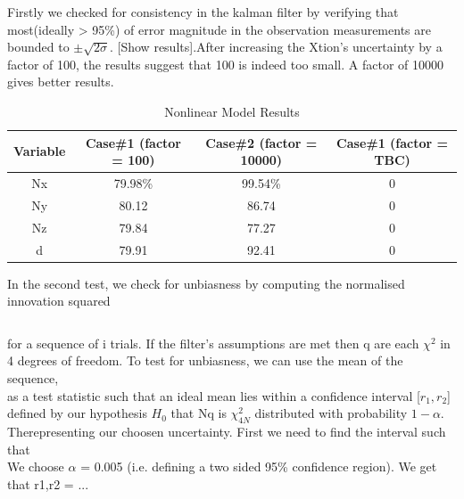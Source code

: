 \documentclass[]{article}
\begin{document}
{Firstly we checked for consistency in the kalman filter by verifying that most(ideally > 95\%) of error magnitude in the observation measurements are bounded to $\pm\sqrt{2\sigma}$. [Show results].After increasing the Xtion's uncertainty by a factor of 100, the results suggest that 100 is indeed too small. A factor of 10000 gives better results.

\begin{table}[ht]
\caption{Nonlinear Model Results} %
\centering %
\begin{tabular}{c c c c} %
\hline\hline %
Variable & Case\#1 (factor = 100) & Case\#2 (factor = 10000) & Case\#1 (factor = TBC) \\ [0.5ex] %
\hline %
    Nx 	& 79.98\% 	& 99.54\%	& 0\\
    Ny 	& 80.12 	& 86.74 	&0\\
    Nz 	& 79.84 	& 77.27 	&0\\
    d 	& 79.91 	&	92.41 	&0\\ [1ex] %
\hline %
\end{tabular}
\label{table:firstTest} %
\end{table}

 In the second test, we check for unbiasness by computing the normalised innovation squared

\begin{equation}\label{first}
\end{equation}

for a sequence of i trials. If the filter's assumptions are met then q are each $\chi^{2}$ in 4 degrees of freedom. To test for unbiasness, we can use the mean of the sequence,
\begin{equation}\label{first}
\end{equation}
as a test statistic such that an ideal mean lies within a confidence interval [$r_{1}, r_{2}$] defined by our hypothesis $H_0$ that Nq is  $\chi_{4N}^{2}$ distributed with probability $1-\alpha$. Therepresenting our choosen uncertainty. First we need to find the interval such that
\begin{equation}\label{first}
\end{equation}
We choose $\alpha$ = 0.005 (i.e. defining a two sided 95\% confidence region). We get that
r1,r2 = ...

}
\end{document}
